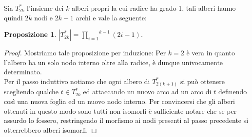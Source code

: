 \documentclass[11pt, twoside]{report}
\theoremstyle{definition}
\theoremstyle{plain}
\newtheorem{prop}[teo]{Proposizione}
\theoremstyle{remark}
\numberwithin{equation}{chapter}
\begin{document}
Sia $T_{2k}^*$ l'insieme dei $k$-alberi propri la cui radice ha grado 1, tali alberi hanno quindi $2k$ nodi e $2k-1$ archi e vale la seguente:

\begin{prop}
$\left| T_{2k}^* \right| = \stackrel{k-1}{\prod\limits_{i=1}} (2i-1)$.
\end{prop}
\begin{proof}
Mostriamo tale proposizione per induzione: Per $k=2$ è vera in quanto l'albero ha un solo nodo interno oltre alla radice, è dunque univocamente determinato.\\
Per il passo induttivo notiamo che ogni albero di $T_{2(k+1)}^*$ si può ottenere scegliendo qualche $t\in T_{2k}^*$ ed attaccando un nuovo arco ad un arco di $t$ definendo così una nuova foglia ed un nuovo nodo interno. Per convincersi che gli alberi ottenuti in questo modo sono tutti non isomorfi è sufficiente notare che se per assurdo lo fossero, restringendo il morfismo ai nodi presenti al passo precedente si otterrebbero alberi isomorfi.
\end{proof} %
\end{document}
